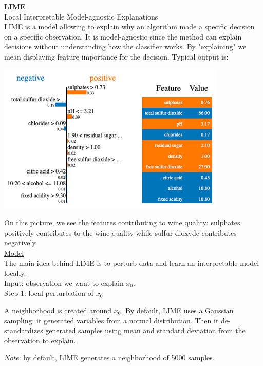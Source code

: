 \textbf{LIME} \\

Local Interpretable Model-agnostic Explanations \\

LIME is a model allowing to explain why an algorithm made a specific decision on a specific observation. It is model-agnostic since the method can explain decisions without understanding how the classifier works. By "explaining" we mean displaying feature importance for the decision. Typical output is:

\begin{center}
\includegraphics[scale=0.5]{LIME_wine_quality_2.png}
\end{center}

On this picture, we see the features contributing to wine quality: sulphates positively contributes to the wine quality while sulfur dioxyde contributes negatively. \\

\underline{Model} \\

The main idea behind LIME is to perturb data and learn an interpretable model locally. \\


Input: observation we want to explain $x_0$. \\

Step 1: local perturbation of $x_0$

A neighborhood is created around $x_0$. By default, LIME uses a Gaussian sampling: it generated variables from a normal distribution. Then it de-standardizes generated samples using mean and standard deviation from the observation to explain.

\textit{Note}: by default, LIME generates a neighborhood of 5000 samples. \\

